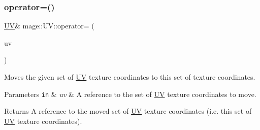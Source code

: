 \subsubsection{\texorpdfstring{operator=()}{operator=()}\hspace{0.1cm}{\footnotesize\ttfamily [2/2]}}
{\footnotesize\ttfamily \hyperlink{structmage_1_1_u_v}{UV}\& mage\+::\+U\+V\+::operator= (\begin{DoxyParamCaption}\item[{\hyperlink{structmage_1_1_u_v}{UV} \&\&}]{uv }\end{DoxyParamCaption})\hspace{0.3cm}{\ttfamily [default]}}

Moves the given set of \hyperlink{structmage_1_1_u_v}{UV} texture coordinates to this set of texture coordinates.


\begin{DoxyParams}[1]{Parameters}
\mbox{\tt in}  & {\em uv} & A reference to the set of \hyperlink{structmage_1_1_u_v}{UV} texture coordinates to move. \\
\hline
\end{DoxyParams}
\begin{DoxyReturn}{Returns}
A reference to the moved set of \hyperlink{structmage_1_1_u_v}{UV} texture coordinates (i.\+e. this set of \hyperlink{structmage_1_1_u_v}{UV} texture coordinates). 
\end{DoxyReturn}
